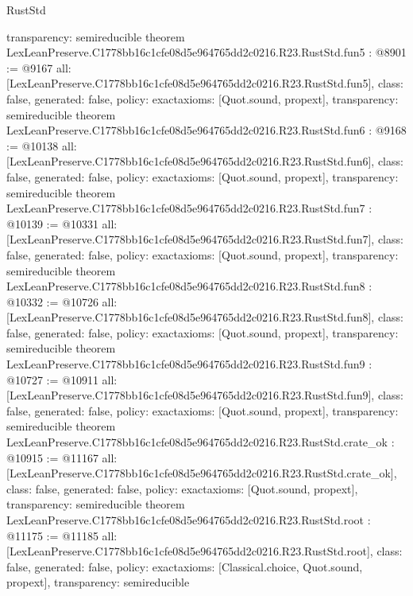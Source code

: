 \begin{lexlean}{RustStd}
\begin{coremodule}
{  transparency: semireducible
}
theorem LexLeanPreserve.C1778bb16c1cfe08d5e964765dd2c0216.R23.RustStd.fun5 : @8901 := @9167 {
  all: [LexLeanPreserve.C1778bb16c1cfe08d5e964765dd2c0216.R23.RustStd.fun5],
  class: false,
  generated: false,
  policy: exact{axioms: [Quot.sound, propext]},
  transparency: semireducible
}
theorem LexLeanPreserve.C1778bb16c1cfe08d5e964765dd2c0216.R23.RustStd.fun6 : @9168 := @10138 {
  all: [LexLeanPreserve.C1778bb16c1cfe08d5e964765dd2c0216.R23.RustStd.fun6],
  class: false,
  generated: false,
  policy: exact{axioms: [Quot.sound, propext]},
  transparency: semireducible
}
theorem LexLeanPreserve.C1778bb16c1cfe08d5e964765dd2c0216.R23.RustStd.fun7 : @10139 := @10331 {
  all: [LexLeanPreserve.C1778bb16c1cfe08d5e964765dd2c0216.R23.RustStd.fun7],
  class: false,
  generated: false,
  policy: exact{axioms: [Quot.sound, propext]},
  transparency: semireducible
}
theorem LexLeanPreserve.C1778bb16c1cfe08d5e964765dd2c0216.R23.RustStd.fun8 : @10332 := @10726 {
  all: [LexLeanPreserve.C1778bb16c1cfe08d5e964765dd2c0216.R23.RustStd.fun8],
  class: false,
  generated: false,
  policy: exact{axioms: [Quot.sound, propext]},
  transparency: semireducible
}
theorem LexLeanPreserve.C1778bb16c1cfe08d5e964765dd2c0216.R23.RustStd.fun9 : @10727 := @10911 {
  all: [LexLeanPreserve.C1778bb16c1cfe08d5e964765dd2c0216.R23.RustStd.fun9],
  class: false,
  generated: false,
  policy: exact{axioms: [Quot.sound, propext]},
  transparency: semireducible
}
theorem LexLeanPreserve.C1778bb16c1cfe08d5e964765dd2c0216.R23.RustStd.crate_ok : @10915 := @11167 {
  all: [LexLeanPreserve.C1778bb16c1cfe08d5e964765dd2c0216.R23.RustStd.crate_ok],
  class: false,
  generated: false,
  policy: exact{axioms: [Quot.sound, propext]},
  transparency: semireducible
}
theorem LexLeanPreserve.C1778bb16c1cfe08d5e964765dd2c0216.R23.RustStd.root : @11175 := @11185 {
  all: [LexLeanPreserve.C1778bb16c1cfe08d5e964765dd2c0216.R23.RustStd.root],
  class: false,
  generated: false,
  policy: exact{axioms: [Classical.choice, Quot.sound, propext]},
  transparency: semireducible
}


\end{coremodule}
\end{lexlean}

